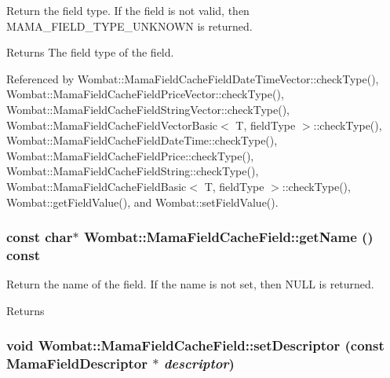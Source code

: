 Return the field type. If the field is not valid, then MAMA\_\-FIELD\_\-TYPE\_\-UNKNOWN is returned.

\begin{DoxyReturn}{Returns}
The field type of the field. 
\end{DoxyReturn}


Referenced by Wombat::MamaFieldCacheFieldDateTimeVector::checkType(), Wombat::MamaFieldCacheFieldPriceVector::checkType(), Wombat::MamaFieldCacheFieldStringVector::checkType(), Wombat::MamaFieldCacheFieldVectorBasic$<$ T, fieldType $>$::checkType(), Wombat::MamaFieldCacheFieldDateTime::checkType(), Wombat::MamaFieldCacheFieldPrice::checkType(), Wombat::MamaFieldCacheFieldString::checkType(), Wombat::MamaFieldCacheFieldBasic$<$ T, fieldType $>$::checkType(), Wombat::getFieldValue(), and Wombat::setFieldValue().\hypertarget{classWombat_1_1MamaFieldCacheField_abe1b06ea7737ae6d9aa323d5ca2c1b78}{
\subsubsection[{getName}]{\setlength{\rightskip}{0pt plus 5cm}const char$\ast$ Wombat::MamaFieldCacheField::getName () const}}
\label{classWombat_1_1MamaFieldCacheField_abe1b06ea7737ae6d9aa323d5ca2c1b78}


Return the name of the field. If the name is not set, then NULL is returned. \begin{DoxyReturn}{Returns}

\end{DoxyReturn}
\hypertarget{classWombat_1_1MamaFieldCacheField_a994ecf6a4620857e9b6d3669ca485dc3}{
\subsubsection[{setDescriptor}]{\setlength{\rightskip}{0pt plus 5cm}void Wombat::MamaFieldCacheField::setDescriptor (const {\bf MamaFieldDescriptor} $\ast$ {\em descriptor})}}
\label{classWombat_1_1MamaFieldCacheField_a994ecf6a4620857e9b6d3669ca485dc3}



